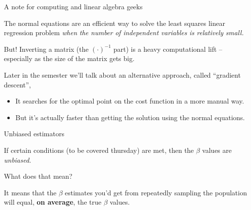 \documentclass[aspectratio=169]{beamer}
\begin{document}
\begin{frame}{A note for computing and linear algebra geeks}

The normal equations are an efficient way to solve the least squares linear regression problem \textit{when the number of independent variables is relatively small.}

\vspace{5mm}

But!  Inverting a matrix (the $(\cdot)^{-1}$ part) is a heavy computational lift -- especially as the size of the matrix gets big. 


\vspace{5mm}

Later in the semester we'll talk about an alternative approach, called ``gradient descent'', 
\begin{itemize}
\item  It searches for the optimal point on the cost function in a more manual way. 
\item But it's actually faster than getting the solution using the normal equations.
\end{itemize}
\end{frame}


\begin{frame}{Unbiased estimators}

If certain conditions (to be covered thursday) are met, then the $\beta$ values are \textit{unbiased}.

\vspace{5mm}

What does that mean?

\vspace{5mm}
\pause

It means that the $\beta$ estimates you'd get from repeatedly sampling the population will equal, \textbf{on average}, the true $\beta$ values.

\end{frame}
\end{document}
